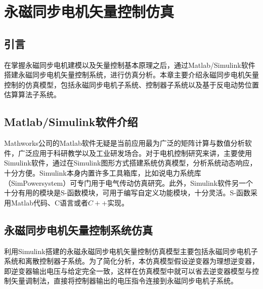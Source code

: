 \chapter{永磁同步电机矢量控制仿真}
\section{引言}
在掌握永磁同步电机建模以及矢量控制基本原理之后，通过Matlab/Simulink软件搭建永磁同步电机矢量控制系统，进行仿真分析。本章主要介绍永磁同步电机矢量控制的仿真模型，包括永磁同步电机子系统、控制器子系统以及基于反电动势位置估算算法子系统。
\section{Matlab/Simulink软件介绍}
Mathworks公司的Matlab软件无疑是当前应用最为广泛的矩阵计算与数值分析软件，广泛应用于科研教学以及工业研发场合。对于电机控制研究来讲，主要使用Simulink软件，通过在Simulink图形方式搭建系统仿真模型，分析系统动态响应，十分方便。Simulink本身内置许多工具箱库，比如说电力系统库（SimPowersystem）可专门用于电气传动仿真研究。此外，Simulink软件另一个十分有用的模块是S-函数模块，可用于编写自定义功能模块，十分灵活。S-函数采用Matlab代码、C语言或者$C++$实现\cite{matlab}。
\section{永磁同步电机矢量控制系统仿真}
利用Simulink搭建的永磁永磁同步电机矢量控制仿真模型主要包括永磁同步电机子系统和离散控制器子系统。为了简化分析，本仿真模型假设逆变器为理想逆变器，即逆变器输出电压与给定完全一致，这样在仿真模型中就可以省去逆变器模型与控制矢量调制法，直接将控制器输出的电压指令连接到永磁同步电机子系统。
